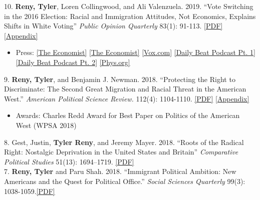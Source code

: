 \documentclass[11pt, a4paper]{article}
\newcommand{\years}[1]{\marginnote{\scriptsize #1}}
\begin{document}
\years{} 10. \textbf{Reny, Tyler}, Loren Collingwood, and Ali Valenzuela. 2019. ``Vote Switching in the 2016 Election: Racial and Immigration Attitudes, Not Economics, Explains Shifts in White Voting''  \textit{Public Opinion Quarterly} 83(1): 91-113. \href{http://tylerreny.github.io/pdf/pubs/final_submission_reny_etal_poq_public.pdf}{[PDF]} \href{http://tylerreny.github.io/pdf/pubs/final_submission_reny_etal_poq_2018_appendix.pdf}{[Appendix]}

\begin{itemize}
  \item Press: \href{https://www.economist.com/united-states/2020/02/01/who-will-be-donald-trumps-most-forceful-foe}{[The Economist]} \href{https://www.economist.com/united-states/2019/07/04/the-best-line-in-the-first-televised-debate-may-hurt-the-democrats}{[The Economist]} \href{https://www.vox.com/policy-and-politics/2018/10/16/17980820/trump-obama-2016-race-racism-class-economy-2018-midterm}{[Vox.com]} \href{http://www.btrtoday.com/listen/thedailybeat/vote-switching-in-the-2016-election-with-tyler-reny-part-1/}{[Daily Beat Podcast Pt. 1]} \href{http://www.btrtoday.com/listen/thedailybeat/vote-switching-white-economic-anxiety-more-with-tyler-reny-part2/}{[Daily Beat Podcast Pt. 2]} \href{https://phys.org/news/2019-07-attitudes-immigration-underscored-vote-election.html}{[Phys.org]}
\end{itemize}

\years{2018} 9. \textbf{Reny, Tyler}, and Benjamin J. Newman. 2018. ``Protecting the Right to Discriminate: The Second Great Migration and Racial Threat in the American West.'' \textit{American Political Science Review.} 112(4): 1104-1110. \href{http://tylerreny.github.io/pdf/pubs/reny_newman_apsr_2018.pdf}{[PDF]} \href{http://tylerreny.github.io/pdf/pubs/reny_newman_apsr_2018_SI.pdf}{[Appendix]}
\begin{itemize}
  \item Awards: Charles Redd Award for Best Paper on Politics of the American West (WPSA 2018)
\end{itemize}

\years{} 8. Gest, Justin, \textbf{Tyler Reny}, and Jeremy Mayer. 2018. ``Roots of the Radical Right: Nostalgic Deprivation in the United States and Britain'' \textit{Comparative Political Studies} 51(13): 1694–1719. \href{http://tylerreny.github.io/pdf/pubs/reny_2017_cps_final.pdf}{[PDF]}\\

\years{} 7. \textbf{Reny, Tyler} and Paru Shah. 2018. ``Immigrant Political Ambition:  New Americans and the Quest for Political Office.'' \textit{Social Sciences Quarterly} 99(3): 1038-1059.\href{http://tylerreny.github.io/pdf/pubs/reny_shah_2018_ssq_immigrant_ambition.pdf}{[PDF]} 
\end{document}
